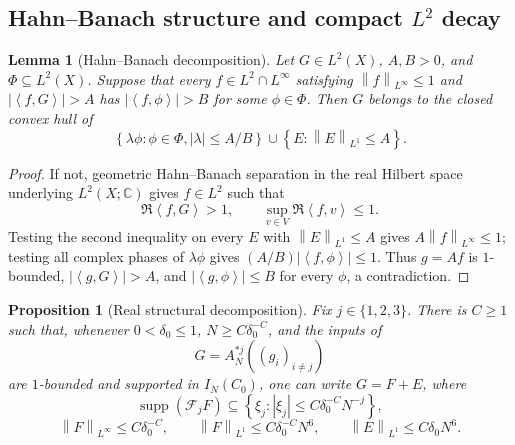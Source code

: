 \documentclass[11pt]{article}
\newtheorem{proposition}[theorem]{Proposition}
\newtheorem{lemma}[theorem]{Lemma}
\newcommand{\Cplx}{\mathbb{C}}
\newcommand{\supp}{\operatorname{supp}}
\newcommand{\ip}[2]{\left\langle #1,#2\right\rangle}
\newcommand{\norm}[2]{\left\lVert #1\right\rVert_{#2}}
\newcommand{\abs}[1]{\left|#1\right|}
\newcommand{\set}[1]{\left\{#1\right\}}
\newcommand{\indices}{\{1,2,3\}}
\begin{document}
	\subsection{Hahn--Banach structure and compact \(L^2\) decay}
	
	\begin{lemma}[Hahn--Banach decomposition]\label{lem:hb-decomposition}
		Let \(G\in L^2(X)\), \(A,B>0\), and \(\Phi\subseteq L^2(X)\).  Suppose that every
		\(f\in L^2\cap L^\infty\) satisfying \(\norm f{L^\infty}\leq1\) and
		\(\abs{\ip fG}>A\) has
		\(\abs{\ip f\phi}>B\) for some \(\phi\in\Phi\).  Then \(G\) belongs to the closed convex hull of
		\[
		\set{\lambda\phi:\phi\in\Phi,\abs\lambda\leq A/B}
		\cup
		\set{E:\norm E{L^1}\leq A}.
		\]
	\end{lemma}
	
	\begin{proof}
		If not, geometric Hahn--Banach separation in the real Hilbert space underlying
		\(L^2(X;\Cplx)\) gives \(f\in L^2\) such that
		\[
		\Re\ip fG>1,\qquad
		\sup_{v\in V}\Re\ip fv\leq1.
		\]
		Testing the second inequality on every \(E\) with \(\norm E{L^1}\leq A\) gives
		\(A\norm f{L^\infty}\leq1\); testing all complex phases of
		\(\lambda\phi\) gives
		\((A/B)\abs{\ip f\phi}\leq1\).  Thus \(g=Af\) is \(1\)-bounded,
		\(\abs{\ip gG}>A\), and
		\(\abs{\ip g\phi}\leq B\) for every \(\phi\), a contradiction.
	\end{proof}
	
	\begin{proposition}[Real structural decomposition]\label{prop:real-structural-decomposition}
		Fix \(j\in\indices\).  There is \(C\geq1\) such that, whenever
		\(0<\delta_0\leq1\), \(N\geq C\delta_0^{-C}\), and the inputs of
		\[
		G=A_N^{*j}((g_i)_{i\neq j})
		\]
		are \(1\)-bounded and supported in \(I_N(C_0)\), one can write \(G=F+E\), where
		\[
		\supp(\mathcal F_jF)
		\subseteq
		\set{\xi_j:\abs{\xi_j}\leq C\delta_0^{-C}N^{-j}},
		\]
		\[
		\norm F{L^\infty}\leq C\delta_0^{-C},
		\qquad
		\norm F{L^1}\leq C\delta_0^{-C}N^6,
		\qquad
		\norm E{L^1}\leq C\delta_0N^6.
		\]
	\end{proposition}
	
\end{document}

